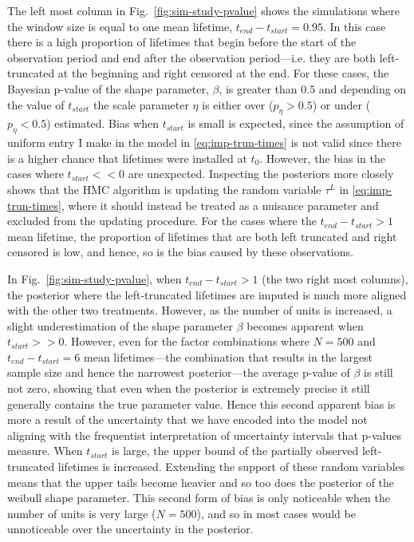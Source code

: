 The left most column in Fig.~\ref{fig:sim-study-pvalue} shows the simulations where the window size is equal to one mean lifetime, $t_{end} - t_{start} = 0.95$. In this case there is a high proportion of lifetimes that begin before the start of the observation period and end after the observation period---i.e. they are both left-truncated at the beginning and right censored at the end. For these cases, the Bayesian p-value of the shape parameter, $\beta$, is greater than $0.5$ and depending on the value of $t_{start}$ the scale parameter $\eta$ is either over ($p_{\eta} > 0.5$) or under ($p_{\eta} < 0.5$) estimated. Bias when $t_{start}$ is small is expected, since the assumption of uniform entry I make in the model in \eqref{eq:imp-trun-times} is not valid since there is a higher chance that lifetimes were installed at $t_0$. However, the bias in the cases where $t_{start} << 0$ are unexpected. Inspecting the posteriors more closely shows that the HMC algorithm is updating the random variable $\tau^L$ in \eqref{eq:imp-trun-times}, where it should instead be treated as a nuisance parameter and excluded from the updating procedure. For the cases where the $t_{end} - t_{start} > 1$ mean lifetime, the proportion of lifetimes that are both left truncated and right censored is low, and hence, so is the bias caused by these observations. 

In Fig.~\ref{fig:sim-study-pvalue}, when $t_{end} - t_{start} > 1$ (the two right most columns), the posterior where the left-truncated lifetimes are imputed is much more aligned with the other two treatments. However, as the number of units is increased, a slight underestimation of the shape parameter $\beta$ becomes apparent when $t_{start} >> 0$. However, even for the factor combinations where $N = 500$ and $t_{end} - t_{start} = 6$ mean lifetimes---the combination that results in the largest sample size and hence the narrowest posterior---the average p-value of $\beta$ is still not zero, showing that even when the posterior is extremely precise it still generally contains the true parameter value. Hence this second apparent bias is more a result of the uncertainty that we have encoded into the model not aligning with the frequentist interpretation of uncertainty intervals that p-values measure. When $t_{start}$ is large, the upper bound of the partially observed left-truncated lifetimes is increased. Extending the support of these random variables means that the upper tails become heavier and so too does the posterior of the weibull shape parameter. This second form of bias is only noticeable when the number of units is very large ($N = 500$), and so in most cases would be unnoticeable over the uncertainty in the posterior.

